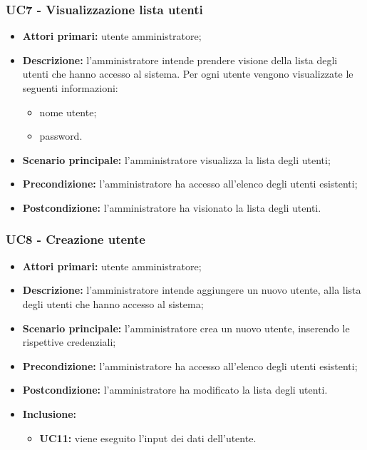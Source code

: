 
\subsubsection{UC7 - Visualizzazione lista utenti}
\begin{itemize}
	\item \textbf{Attori primari:} utente amministratore;
	\item \textbf{Descrizione:} l'amministratore intende prendere visione della lista degli utenti che hanno accesso al sistema. Per ogni utente vengono visualizzate le seguenti informazioni:
		\begin{itemize}
			\item nome utente;
			\item password.
		\end{itemize}
	\item \textbf{Scenario principale:} l'amministratore visualizza la lista degli utenti;
	\item \textbf{Precondizione:} l'amministratore ha accesso all'elenco degli utenti esistenti;
	\item \textbf{Postcondizione:} l'amministratore ha visionato la lista degli utenti.
\end{itemize}


\subsubsection{UC8 - Creazione utente}
	\begin{itemize}
		\item \textbf{Attori primari:} utente amministratore;
		\item \textbf{Descrizione:} l'amministratore intende aggiungere un nuovo utente, alla lista degli utenti che hanno accesso al sistema;
		\item \textbf{Scenario principale:} l'amministratore crea un nuovo utente, inserendo le rispettive credenziali;
		\item \textbf{Precondizione:} l'amministratore ha accesso all'elenco degli utenti esistenti;
		\item \textbf{Postcondizione:} l'amministratore ha modificato la lista degli utenti.
		\item \textbf{Inclusione:} 
		\begin{itemize}
			\item \textbf{UC11:} viene eseguito l'input dei dati dell'utente.
		\end{itemize}
	\end{itemize}

